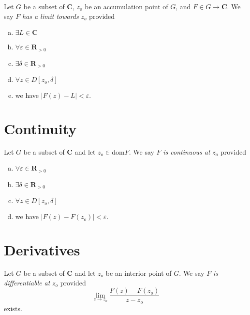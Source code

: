 \documentclass[letterpaper,landscape,9pt,fleqn]{extarticle}
\newcommand{\dom}{\mathrm{dom}}
\newcommand{\reals}{\mathbf{R}}
\newcommand{\complex}{\mathbf{C}}
\newenvironment{alphalist}{
  \begin{enumerate}[(a)]
    \addtolength{\itemsep}{-1.0\itemsep}}
  {\end{enumerate}}
\begin{document}
\begin{multicols*}{3}
Let $G$ be a subset of $\complex$, $z_o$ be an accumulation point of $G$, and $F \in G \to \complex$.
We say $F$ \emph{has a limit towards} $z_o$ provided
\begin{alphalist}
\item $\exists L \in \complex$
\item $\forall \varepsilon \in \reals_{>0}$
\item $\exists \delta  \in \reals_{>0}$
\item $\forall z \in D[z_o, \delta] $
\item we have $|F(z) - L| < \varepsilon$.
\end{alphalist}

\section*{Continuity}

Let $G$ be a subset of $\complex$ and let $z_o \in \dom{F}$. We say $F$ \emph{is continuous at} $z_o$ provided
\begin{alphalist}
\item $\forall \varepsilon \in \reals_{>0}$
\item $\exists \delta  \in \reals_{>0}$
\item $\forall z \in D[z_o, \delta] $
\item we have $|F(z) - F(z_o)| < \varepsilon$.
\end{alphalist}

\section*{Derivatives}
Let $G$ be a subset of $\complex$ and let $z_o$ be an interior point of $G$. We say $F$ \emph{is differentiable at} $z_o$ provided 
\begin{equation*}
  \lim_{z\to z_o} \frac{F(z) - F(z_o)}{z-z_o}
\end{equation*}
exists.
\vfill
{}
\end{multicols*}%
\end{document}
